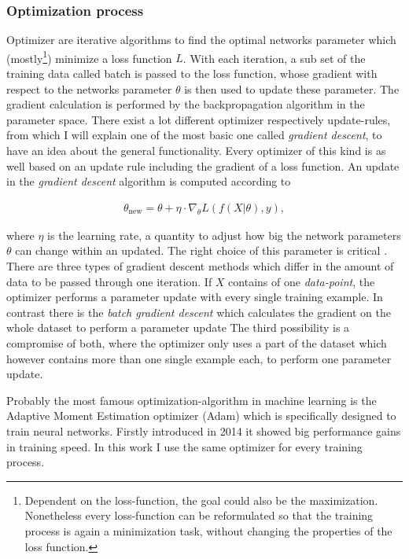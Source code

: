 \subsubsection{Optimization process}
Optimizer are iterative algorithms to find the optimal networks parameter which (mostly\footnote{Dependent on the loss-function, the goal could also be the maximization. Nonetheless every loss-function can be reformulated so that the training process is again a minimization task, without changing the properties of the loss function.}) minimize a loss function $L$. With each iteration, a sub set of the training data called batch is passed to the loss function, whose gradient with respect to the networks parameter $\theta$ is then used to update these parameter. The gradient calculation is performed by the backpropagation algorithm \cite{Rumelhart1986} in the parameter space. There exist a lot different optimizer respectively update-rules, from which I will explain one of the most basic one called \textit{gradient descent}, to have an idea about the general functionality. Every optimizer of this kind is as well based on an update rule including the gradient of a loss function. An update in the \textit{gradient descent} algorithm is computed according to

\begin{align}
    \theta_{\text{new}}=\theta+\eta\cdot\nabla_{\theta}L(f(X|\theta),y),
\end{align}

where $\eta$ is the learning rate, a quantity to adjust how big the network parameters $\theta$ can change within an updated. The right choice of this parameter is critical \cite{wu_demystifying_2019}. There are three types of gradient descent methods which differ in the amount of data to be passed through one iteration. If $X$ contains of one \textit{data-point}, the optimizer performs a parameter update with every single training example. In contrast there is the \textit{batch gradient descent} which calculates the gradient on the whole dataset to perform a parameter update
The third possibility is a compromise of both, where the optimizer only uses a part of the dataset which however contains more than one single example each, to perform one parameter update.

Probably the most famous optimization-algorithm in machine learning is the Adaptive Moment Estimation optimizer (Adam)\cite{adam} which is specifically designed to train neural networks. Firstly introduced in 2014 it showed big performance gains in training speed. In this work I use the same optimizer for every training process.\\

